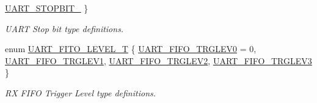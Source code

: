 \begin{DoxyCompactItemize}
\hyperlink{class_c_serial_af02af389f5596b7b40cf0d2ece57b04bafe7ff299f68959471436234643298e71}{U\-A\-R\-T\-\_\-\-S\-T\-O\-P\-B\-I\-T\-\_}
 \}
\begin{DoxyCompactList}\small\item\em U\-A\-R\-T Stop bit type definitions. \end{DoxyCompactList}\item 
enum \hyperlink{class_c_serial_a767bb157f0f469eb5bf5c99b8ada42f1}{U\-A\-R\-T\-\_\-\-F\-I\-T\-O\-\_\-\-L\-E\-V\-E\-L\-\_\-\-T} \{ \hyperlink{class_c_serial_a767bb157f0f469eb5bf5c99b8ada42f1aec8c4b69719ee6b1dc43cf6ccdd999de}{U\-A\-R\-T\-\_\-\-F\-I\-F\-O\-\_\-\-T\-R\-G\-L\-E\-V0} = 0, 
\hyperlink{class_c_serial_a767bb157f0f469eb5bf5c99b8ada42f1a2d29eb800e28d845f00b9fd5df1b955c}{U\-A\-R\-T\-\_\-\-F\-I\-F\-O\-\_\-\-T\-R\-G\-L\-E\-V1}, 
\hyperlink{class_c_serial_a767bb157f0f469eb5bf5c99b8ada42f1a3ca31e41f3d74e387b0ff625a927bcf4}{U\-A\-R\-T\-\_\-\-F\-I\-F\-O\-\_\-\-T\-R\-G\-L\-E\-V2}, 
\hyperlink{class_c_serial_a767bb157f0f469eb5bf5c99b8ada42f1a6893ab299c8d6be2e17efb39cd05e1a1}{U\-A\-R\-T\-\_\-\-F\-I\-F\-O\-\_\-\-T\-R\-G\-L\-E\-V3}
 \}
\begin{DoxyCompactList}\small\item\em R\-X F\-I\-F\-O Trigger Level type definitions. \end{DoxyCompactList}\end{DoxyCompactItemize}
